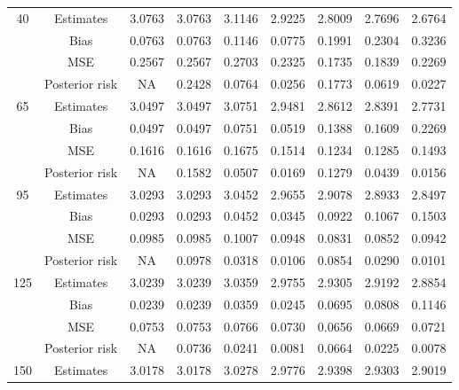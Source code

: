 \documentclass[a4paper,12pt]{report}
\begin{document}
{\begin{minipage}{\linewidth}
{\begin{tabular}{|c|c|c|c|c|c|c|c|c|}
			40		&Estimates      &3.0763 &3.0763 &3.1146 &2.9225 &2.8009 &2.7696 &2.6764 \\
			&Bias           &0.0763 &0.0763 &0.1146 &0.0775 &0.1991 &0.2304 &0.3236 \\
			&MSE            &0.2567 &0.2567 &0.2703 &0.2325 &0.1735 &0.1839 &0.2269 \\
			&Posterior risk    &NA &0.2428 &0.0764 &0.0256 &0.1773 &0.0619 &0.0227 \\ \hline
			65		&Estimates      &3.0497 &3.0497 &3.0751 &2.9481 &2.8612 &2.8391 &2.7731 \\
			&Bias           &0.0497 &0.0497 &0.0751 &0.0519 &0.1388 &0.1609 &0.2269 \\
			&MSE            &0.1616 &0.1616 &0.1675 &0.1514 &0.1234 &0.1285 &0.1493 \\
			&Posterior risk    &NA &0.1582 &0.0507 &0.0169 &0.1279 &0.0439 &0.0156 \\ \hline
			95		&Estimates      &3.0293 &3.0293 &3.0452 &2.9655 &2.9078 &2.8933 &2.8497 \\
			&Bias           &0.0293 &0.0293 &0.0452 &0.0345 &0.0922 &0.1067 &0.1503 \\
			&MSE            &0.0985 &0.0985 &0.1007 &0.0948 &0.0831 &0.0852 &0.0942 \\
			&Posterior risk    &NA &0.0978 &0.0318 &0.0106 &0.0854 &0.0290 &0.0101 \\ \hline
			125		&Estimates      &3.0239 &3.0239 &3.0359 &2.9755 &2.9305 &2.9192 &2.8854 \\
			&Bias           &0.0239 &0.0239 &0.0359 &0.0245 &0.0695 &0.0808 &0.1146 \\
			&MSE            &0.0753 &0.0753 &0.0766 &0.0730 &0.0656 &0.0669 &0.0721 \\
			&Posterior risk    &NA &0.0736 &0.0241 &0.0081 &0.0664 &0.0225 &0.0078 \\ \hline
			150		&Estimates      &3.0178 &3.0178 &3.0278 &2.9776 &2.9398 &2.9303 &2.9019 \\

\end{tabular}}
\end{minipage}}
\end{document}

